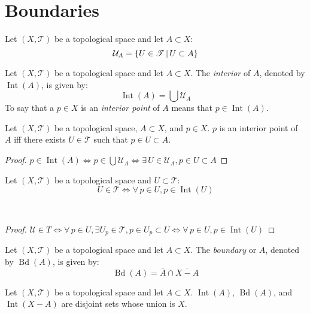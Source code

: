 \documentclass[letterpaper,12pt,fleqn]{article}
\newcommand{\T}{\mathscr{T}}
\newcommand{\U}{\mathcal{U}}
\DeclareMathOperator{\Int}{Int}
\DeclareMathOperator{\Bd}{Bd}
\begin{document}
\section*{Boundaries}

\begin{notation}
  Let \((X,\T)\) be a topological space and let \(A\subset X\):
  \[\U_A=\setb{U\in\T}{U\subset A}\]
\end{notation}

\begin{definition}[Interior]
  Let \((X,\T)\) be a topological space and let \(A\subset X\).  The \emph{interior} of \(A\), denoted by
  \(\Int(A)\), is given by:
  \[\Int(A)=\bigcup\U_A\]
  To say that a \(p\in X\) is an \emph{interior point} of \(A\) means that \(p\in\Int(A)\).
\end{definition}

\begin{theorem}
  Let \((X,\T)\) be a topological space, \(A\subset X\), and \(p\in X\).  \(p\) is an interior point of \(A\) iff
  there exists \(U\in\T\) such that \(p\in U\subset A\).
\end{theorem}

\begin{proof}
  \(p\in\Int(A)\iff p\in\bigcup\U_A\iff\exists\,U\in\U_A,p\in U\subset A\)
\end{proof}

\begin{theorem}
  Let \((X,\T)\) be a topological space and \(U\subset\T\):
  \[U\in\T\iff\forall\,p\in U,p\in\Int(U)\]
\end{theorem}\

\begin{proof}
  \(\U\in T\iff\forall\,p\in U,\exists U_p\in\T,p\in U_p\subset U\iff\forall\,p\in U,p\in\Int(U)\)
\end{proof}

\begin{definition}[Boundary]
  Let \((X,\T)\) be a topological space and let \(A\subset X\).  The \emph{boundary} or \(A\), denoted by
  \(\Bd(A)\), is given by:
  \[\Bd(A)=\bar{A}\cap\overline{X-A}\]
\end{definition}

\begin{theorem}
  Let \((X,\T)\) be a topological space and let \(A\subset X\).  \(\Int(A)\), \(\Bd(A)\), and \(\Int(X-A)\) are
  disjoint sets whose union is \(X\).
\end{theorem}
\end{document}
